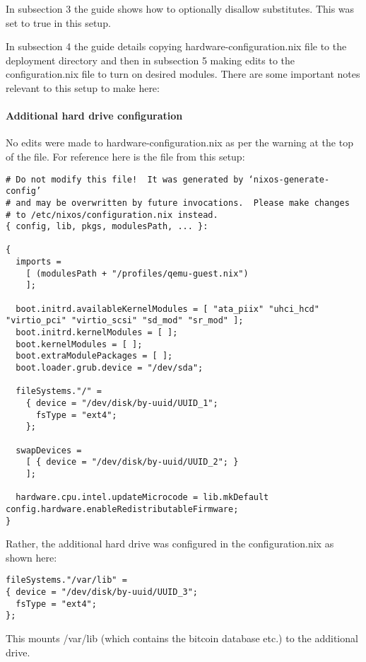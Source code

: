 In subsection 3 the guide shows how to optionally disallow substitutes.
This was set to true in this setup.

In subsection 4 the guide details copying hardware-configuration.nix
file to the deployment directory and then in subsection 5 making edits
to the configuration.nix file to turn on desired modules. There are some
important notes relevant to this setup to make here:

\hypertarget{additional-hard-drive-configuration}{%
\paragraph{Additional hard drive
configuration}\label{additional-hard-drive-configuration}}

No edits were made to hardware-configuration.nix as per the warning at
the top of the file. For reference here is the file from this setup:

\begin{verbatim}
# Do not modify this file!  It was generated by ‘nixos-generate-config’
# and may be overwritten by future invocations.  Please make changes
# to /etc/nixos/configuration.nix instead.
{ config, lib, pkgs, modulesPath, ... }:

{
  imports =
    [ (modulesPath + "/profiles/qemu-guest.nix")
    ];

  boot.initrd.availableKernelModules = [ "ata_piix" "uhci_hcd" "virtio_pci" "virtio_scsi" "sd_mod" "sr_mod" ];
  boot.initrd.kernelModules = [ ];
  boot.kernelModules = [ ];
  boot.extraModulePackages = [ ];
  boot.loader.grub.device = "/dev/sda";

  fileSystems."/" =
    { device = "/dev/disk/by-uuid/UUID_1";
      fsType = "ext4";
    };

  swapDevices =
    [ { device = "/dev/disk/by-uuid/UUID_2"; }
    ];

  hardware.cpu.intel.updateMicrocode = lib.mkDefault config.hardware.enableRedistributableFirmware;
}
\end{verbatim}

Rather, the additional hard drive was configured in the
configuration.nix as shown here:

\begin{verbatim}
fileSystems."/var/lib" =
{ device = "/dev/disk/by-uuid/UUID_3";
  fsType = "ext4";
};
\end{verbatim}

This mounts /var/lib (which contains the bitcoin database etc.) to the
additional drive.

